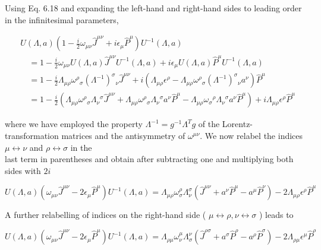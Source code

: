 \documentclass[10pt, letterpaper]{article}
\begin{document}
Using Eq. 6.18 and expanding the left-hand and right-hand sides to leading order in the infinitesimal parameters,

$$
\begin{aligned}
& U(\Lambda, a)\left(1-\frac{i}{2} \omega_{\mu \nu} \hat{J}^{\mu \nu}+i \epsilon_{\mu} \hat{P}^{\mu}\right) U^{-1}(\Lambda, a) \\
& \quad=1-\frac{i}{2} \omega_{\mu \nu} U(\Lambda, a) \hat{J}^{\mu \nu} U^{-1}(\Lambda, a)+i \epsilon_{\mu} U(\Lambda, a) \hat{P}^{\mu} U^{-1}(\Lambda, a) \\
& \quad=1-\frac{i}{2} \Lambda_{\mu \rho} \omega^{\rho}{ }_{\sigma}\left(\Lambda^{-1}\right)^{\sigma}{ }_{\nu} \hat{J}^{\mu \nu}+i\left(\Lambda_{\mu \rho} \epsilon^{\rho}-\Lambda_{\mu \rho} \omega^{\rho}{ }_{\sigma}\left(\Lambda^{-1}\right)^{\sigma}{ }_{\nu} a^{\nu}\right) \hat{P}^{\mu} \\
& \quad=1-\frac{i}{2}\left(\Lambda_{\mu \rho} \omega^{\rho}{ }_{\sigma} \Lambda_{\nu}{ }^{\sigma} \hat{J}^{\mu \nu}+\Lambda_{\mu \rho} \omega^{\rho}{ }_{\sigma} \Lambda_{\nu}{ }^{\sigma} a^{\nu} \hat{P}^{\mu}-\Lambda_{\mu \rho} \omega_{\sigma}{ }^{\rho} \Lambda_{\nu}{ }^{\sigma} a^{\nu} \hat{P}^{\mu}\right)+i \Lambda_{\mu \rho} \epsilon^{\rho} \hat{P}^{\mu}
\end{aligned}
$$

where we have employed the property $\Lambda^{-1}=g^{-1} \Lambda^{T} g$ of the Lorentz-transformation matrices and the antisymmetry of $\omega^{\mu \nu}$. We now relabel the indices $\mu \leftrightarrow \nu$ and $\rho \leftrightarrow \sigma$ in the\\
last term in parentheses and obtain after subtracting one and multiplying both sides with $2 i$

$$
U(\Lambda, a)\left(\omega_{\mu \nu} \hat{J}^{\mu \nu}-2 \epsilon_{\mu} \hat{P}^{\mu}\right) U^{-1}(\Lambda, a)=\Lambda_{\mu \rho} \omega_{\sigma}^{\rho} \Lambda_{\nu}^{\sigma}\left(\hat{J}^{\mu \nu}+a^{\nu} \hat{P}^{\mu}-a^{\mu} \hat{P}^{\nu}\right)-2 \Lambda_{\mu \rho} \epsilon^{\rho} \hat{P}^{\mu}
$$

A further relabelling of indices on the right-hand side ( $\mu \leftrightarrow \rho, \nu \leftrightarrow \sigma$ ) leads to

$$
U(\Lambda, a)\left(\omega_{\mu \nu} \hat{J}^{\mu \nu}-2 \epsilon_{\mu} \hat{P}^{\mu}\right) U^{-1}(\Lambda, a)=\Lambda_{\rho \mu} \omega_{\nu}^{\mu} \Lambda_{\sigma}^{\nu}\left(\hat{J}^{\rho \sigma}+a^{\sigma} \hat{P}^{\rho}-a^{\rho} \hat{P}^{\sigma}\right)-2 \Lambda_{\rho \mu} \epsilon^{\mu} \hat{P}^{\rho}
$$
\end{document}
